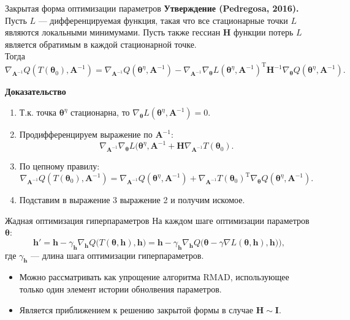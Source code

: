 \documentclass[10pt,pdf,utf8,russian,aspectratio=169]{beamer}
\begin{document}
\begin{frame}{Закрытая форма оптимизации параметров}
\textbf{Утверждение (Pedregosa, 2016).}\\
Пусть $L$ --- дифференцируемая функция, такая что все стационарные точки $L$ являются локальными минимумами.
Пусть также гессиан $\mathbf{H}$ функции потерь $L$ является обратимым в каждой стационарной точке.\\
Тогда
\[
\nabla_{\mathbf{A}^{-1}}Q(T(\boldsymbol{\theta}_0), \mathbf{A}^{-1}) =  \nabla_{\mathbf{A}^{-1}}Q(\boldsymbol{\theta}^\eta, \mathbf{A}^{-1}) - \nabla_{\mathbf{A}^{-1}}\nabla_{\boldsymbol{\theta}} L(\boldsymbol{\theta}^\eta, \mathbf{A}^{-1})^\text{T}\mathbf{H}^{-1}\nabla_{\boldsymbol{\theta}}Q(\boldsymbol{\theta}^\eta, \mathbf{A}^{-1}).
\]

\textbf{Доказательство}\\
\begin{enumerate}
\item Т.к. точка $\boldsymbol{\theta}^\eta$ стационарна, то $\nabla_{\boldsymbol{\theta}} L(\boldsymbol{\theta}^\eta, \mathbf{A}^{-1}) = 0$.
\item Продифференцируем выражение по $\mathbf{A}^{-1}:$
\[
    \nabla_{\mathbf{A}^{-1}}\nabla_{\boldsymbol{\theta}} L(\boldsymbol{\theta}^\eta, \mathbf{A}^{-1} + \mathbf{H}\nabla_{\mathbf{A}^{-1}}T(\boldsymbol{\theta}_0).
\]
\item По цепному правилу:
\[
\nabla_{\mathbf{A}^{-1}}Q(T(\boldsymbol{\theta}_0), \mathbf{A}^{-1}) =  \nabla_{\mathbf{A}^{-1}}Q(\boldsymbol{\theta}^\eta, \mathbf{A}^{-1})  + \nabla_{\mathbf{A}^{-1}}T(\boldsymbol{\theta}_0)^\text{T}\nabla_{\boldsymbol{\theta}}Q(\boldsymbol{\theta}^\eta, \mathbf{A}^{-1}).
\]
\item Подставим в выражение 3 выражение 2 и получим искомое.
\end{enumerate}
\end{frame}

\begin{frame}{Жадная оптимизация гиперпараметров}
На каждом шаге оптимизации параметров $\boldsymbol{\theta}$:
\[
	\mathbf{h}' = \mathbf{h} - \gamma_{\mathbf{h}} \nabla_{\mathbf{h}}  Q \bigl(T(\boldsymbol{\theta}, \mathbf{h}) , \mathbf{h}\bigr) = \mathbf{h} - \gamma_{\mathbf{h}} \nabla_{\mathbf{h}}  Q\bigl(\boldsymbol{\theta} - \gamma \nabla L(\boldsymbol{\theta}, \mathbf{h}), \mathbf{h})\bigr),
\]
где $\gamma_{\mathbf{h}}$ --- длина шага оптимизации гиперпараметров.

\begin{itemize}
\item Можно рассматривать как упрощение алгоритма RMAD, использующее только один элемент истории обнолвения параметров.
\item Является приближением к решению закрытой формы в случае $\mathbf{H} \sim \mathbf{I}$.
\end{itemize}

\end{frame}
\end{document}

